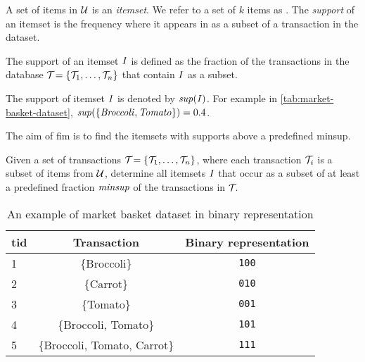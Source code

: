 A set of items in $\mathcal{U}$ is an \textit{itemset}. We refer to a set of $k$ items as \kItemset.
The \textit{support} of an itemset is the frequency where it appears in as a subset of a transaction in the dataset.

\begin{definition}
    The support of an itemset $\mathit{I}$ is defined as the fraction of the transactions in the database $\mathcal{T}_{} = \{\mathcal{T}_{1}, \dots, \mathcal{T}_{n}\}{}$ that contain $\mathit{I}$ as a subset.
\end{definition}
\begin{sloppypar}
    The support of itemset $\mathit{I}$ is denoted by $\mathit{sup({I})}$.
    For example in \autoref{tab:market-basket-dataset}, $\mathit{sup({\{Broccoli, Tomato\}})} = 0.4$.
\end{sloppypar}
The aim of \acl{fim} is to find the itemsets with supports above a predefined \ac{minsup}.

\begin{definition}
    Given a set of transactions $\mathcal{T}_{} = \{\mathcal{T}_{1}, \dots, \mathcal{T}_{n}\}{}$, where each transaction $\mathcal{T}_{i}$ is a subset of items from $\mathcal{U}$, determine all itemsets $\mathit{I}$ that occur as a subset of at least a predefined fraction $\mathit{minsup}$ of the transactions in $\mathcal{T}_{}$.
\end{definition}

\begin{table}[tb]
    \centering
    \begin{tabular}{|l|c|c|}
        \hline
        \textbf{\ac{tid}} & \textbf{Transaction}         & \textbf{Binary representation} \\ \hline
        1            & \{Broccoli\}                 & \texttt{100}                   \\ \hline
        2            & \{Carrot\}                   & \texttt{010}                   \\ \hline
        3            & \{Tomato\}                   & \texttt{001}                   \\ \hline
        4            & \{Broccoli, Tomato\}         & \texttt{101}                   \\ \hline
        5            & \{Broccoli, Tomato, Carrot\} & \texttt{111}                   \\ \hline
    \end{tabular}
    \caption{An example of market basket dataset in binary representation}
    \label{tab:market-basket-dataset}
\end{table}
